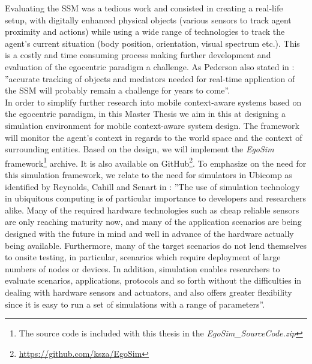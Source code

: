 Evaluating the SSM was a tedious work and consisted in creating a real-life setup, with digitally enhanced physical objects (various sensors to track agent proximity and actions) while using a wide range of technologies to track the agent's current situation (body position, orientation, visual spectrum etc.). This is a costly and time consuming process making further development and evaluation of the egocentric paradigm a challenge. As Pederson also stated in \cite{pederson2011situative}: ''accurate tracking of objects and mediators needed for real-time application of the SSM will probably remain a challenge for years to come''.\\

In order to simplify further research into mobile context-aware systems based on the egocentric paradigm, in this Master Thesis we aim in this at designing a simulation environment for mobile context-aware system design. The framework will monitor the agent's context in regards to the world space and the context of surrounding entities. Based on the design, we will implement the \emph{EgoSim} framework\footnote{The source code is included with this thesis in the \emph{EgoSim\_SourceCode.zip}} archive. It is also available on GitHub\footnote{\url{https://github.com/ksza/EgoSim}}. To emphasize on the need for this simulation framework, we relate to the need for simulators in Ubicomp as identified by Reynolds, Cahill and Senart in \cite{reynolds2006requirements}: ''The use of simulation technology in ubiquitous computing is of particular importance to developers and researchers alike. Many of the required hardware technologies such as cheap reliable sensors are only reaching maturity now, and many of the application scenarios are being designed with the future in mind and well in advance of the hardware actually being available. Furthermore, many of the target scenarios do not lend themselves to onsite testing, in particular, scenarios which require deployment of large numbers of nodes or devices. In addition, simulation enables researchers to evaluate scenarios, applications, protocols and so forth without the difficulties in dealing with hardware sensors and actuators, and also offers greater flexibility since it is easy to run a set of simulations with a range of parameters''.\\

